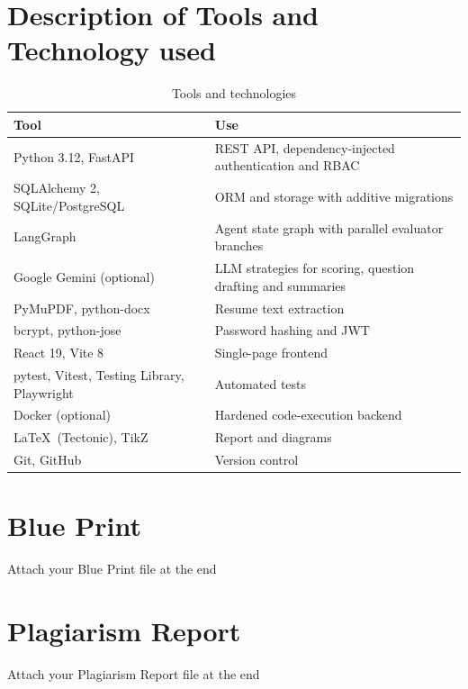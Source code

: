 \section {Description of Tools and  Technology used}
\begin{table}[H]\centering\small\caption{Tools and technologies}
\begin{tabular}{|p{3.6cm}|p{10.4cm}|}\hline
\textbf{Tool} & \textbf{Use}\\ \hline
Python 3.12, FastAPI & REST API, dependency-injected authentication and RBAC\\ \hline
SQLAlchemy 2, SQLite/PostgreSQL & ORM and storage with additive migrations\\ \hline
LangGraph & Agent state graph with parallel evaluator branches\\ \hline
Google Gemini (optional) & LLM strategies for scoring, question drafting and summaries\\ \hline
PyMuPDF, python-docx & Resume text extraction\\ \hline
bcrypt, python-jose & Password hashing and JWT\\ \hline
React 19, Vite 8 & Single-page frontend\\ \hline
pytest, Vitest, Testing Library, Playwright & Automated tests\\ \hline
Docker (optional) & Hardened code-execution backend\\ \hline
\LaTeX\ (Tectonic), TikZ & Report and diagrams\\ \hline
Git, GitHub & Version control\\ \hline
\end{tabular}\end{table}

\section{Blue Print}

Attach your Blue Print file at the end

\section{Plagiarism Report}

Attach your Plagiarism Report file at the end
